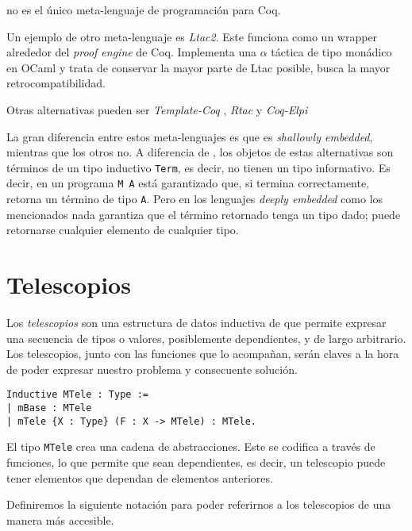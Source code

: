 \Mtac no es el único meta-lenguaje de programación para Coq. 

Un ejemplo de otro meta-lenguaje es \emph{Ltac2}.
Este funciona como un wrapper alrededor del \emph{proof engine} de Coq.
Implementa una $\alpha$ táctica de tipo monádico en OCaml y trata de conservar la mayor parte de Ltac posible, busca la mayor retrocompatibilidad.

Otras alternativas pueden ser \emph{Template-Coq} \cite{DBLP:conf/itp/AnandBCST18}, \emph{Rtac} \cite{DBLP:conf/esop/MalechaB16} y \emph{Coq-Elpi} \cite{tassi:hal-01637063}

La gran diferencia entre estos meta-lenguajes es que \Mtac es \emph{shallowly embedded}, mientras que los otros no. A diferencia de \Mtac, los objetos de estas alternativas son términos de un tipo inductivo \lstinline{Term}, es decir, no tienen un tipo informativo. Es decir, en \Mtac un programa \lstinline{M A} está garantizado que, si termina correctamente, retorna un término de tipo \lstinline{A}. Pero en los lenguajes \emph{deeply embedded} como los mencionados nada garantiza que el término retornado tenga un tipo dado; puede retornarse cualquier elemento de cualquier tipo.

\section{Telescopios}

Los \emph{telescopios} son una estructura de datos inductiva de \Mtac que permite expresar una secuencia de tipos o valores, posiblemente dependientes, y de largo arbitrario.
Los telescopios, junto con las funciones que lo acompañan, serán claves a la hora de poder expresar nuestro problema y consecuente solución.

\begin{lstlisting}[frame=tb,caption={Definicion de telescopio},label=lst:MTele]
Inductive MTele : Type :=
| mBase : MTele
| mTele {X : Type} (F : X -> MTele) : MTele.
\end{lstlisting}

El tipo \lstinline{MTele} crea una cadena de abstracciones.
Este se codifica a través de funciones, lo que permite que sean dependientes, es decir, un telescopio puede tener elementos que dependan de elementos anteriores.

Definiremos la siguiente notación para poder referirnos a los telescopios de una manera más accesible.


